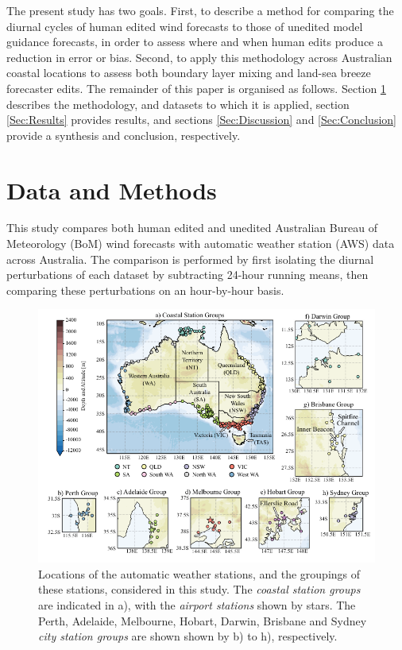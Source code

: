 \documentclass[twocol]{ametsoc}
\begin{document}
The present study has two goals. First, to describe a method for comparing the diurnal cycles of human edited wind forecasts to those of unedited model guidance forecasts, in order to assess where and when human edits produce a reduction in error or bias. Second, to apply this methodology across Australian coastal locations to assess both boundary layer mixing and land-sea breeze forecaster edits. The remainder of this paper is organised as follows. Section \ref{Sec:Methods} describes the methodology, and datasets to which it is applied, section \ref{Sec:Results} provides results, and sections \ref{Sec:Discussion} and \ref{Sec:Conclusion} provide a synthesis and conclusion, respectively.

\section{Data and Methods} \label{Sec:Methods}
This study compares both human edited and unedited Australian Bureau of Meteorology (BoM) wind forecasts with automatic weather station (AWS) data across Australia. The comparison is performed by first isolating the diurnal perturbations of each dataset by subtracting 24-hour running means, then comparing these perturbations on an hour-by-hour basis.

\begin{figure}
\centering
\includegraphics[width=39pc]{map.pdf}
\caption{Locations of the automatic weather stations, and the groupings of these stations, considered in this study. The \textit{coastal station groups} are indicated in a), with the \textit{airport stations} shown by stars. The Perth, Adelaide, Melbourne, Hobart, Darwin, Brisbane and Sydney \textit{city station groups} are shown shown by b) to h), respectively.}
\label{Fig:map}
\end{figure}
\end{document}
